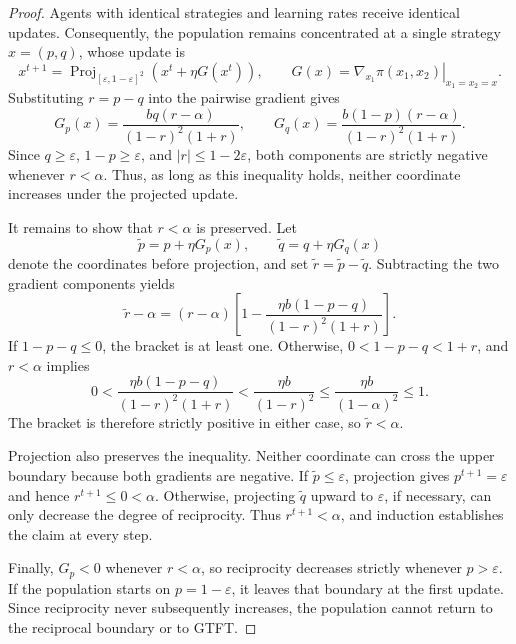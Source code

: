 \documentclass[10pt]{article}
\newcommand{\eps}{\varepsilon}
\begin{document}
\begin{proof}
Agents with identical strategies and learning rates receive identical updates.
Consequently, the population remains concentrated at a single strategy $x=(p,q)$, whose update is
\[
    x^{t+1}=\operatorname{Proj}_{[\eps,1-\eps]^2} \left(x^t+\eta G(x^t)\right),
    \qquad
    G(x) = \left.\nabla_{x_1}\pi(x_1,x_2)\right|_{x_1=x_2=x}.
\]
Substituting $r=p-q$ into the pairwise gradient gives
\[
    G_p(x)=\frac{bq(r-\alpha)}{(1-r)^2(1+r)},
    \qquad
    G_q(x)=\frac{b(1-p)(r-\alpha)}{(1-r)^2(1+r)}.
\]
Since $q\geq\eps$, $1-p\geq\eps$, and $|r|\leq 1-2\eps$, both components are strictly negative whenever $r<\alpha$.
Thus, as long as this inequality holds, neither coordinate increases under the projected update.

It remains to show that $r<\alpha$ is preserved. Let
\[
    \widetilde p=p+\eta G_p(x),
    \qquad
    \widetilde q=q+\eta G_q(x)
\]
denote the coordinates before projection, and set $\widetilde r=\widetilde p-\widetilde q$.
Subtracting the two gradient components yields
\[
    \widetilde r-\alpha
    =
    (r-\alpha)
    \left[
        1-\frac{\eta b(1-p-q)}{(1-r)^2(1+r)}
    \right].
\]
If $1-p-q\leq 0$, the bracket is at least one.
Otherwise, $0<1-p-q<1+r$, and $r<\alpha$ implies
\[
    0
    <
    \frac{\eta b(1-p-q)}{(1-r)^2(1+r)}
    <
    \frac{\eta b}{(1-r)^2}
    \leq
    \frac{\eta b}{(1-\alpha)^2}
    \leq 1.
\]
The bracket is therefore strictly positive in either case, so
$\widetilde r<\alpha$.

Projection also preserves the inequality.
Neither coordinate can cross the upper boundary because both gradients are negative.
If $\widetilde p\leq\eps$, projection gives $p^{t+1}=\eps$ and hence $r^{t+1}\leq 0<\alpha$.
Otherwise, projecting $\widetilde q$ upward to $\eps$, if necessary, can only decrease the degree of reciprocity.
Thus $r^{t+1}<\alpha$, and induction establishes the claim at every step.

Finally, $G_p<0$ whenever $r<\alpha$, so reciprocity decreases strictly whenever $p>\eps$.
If the population starts on $p=1-\eps$, it leaves that boundary at the first update.
Since reciprocity never subsequently increases, the population cannot return to the reciprocal boundary or to GTFT.
\end{proof}
\end{document}
